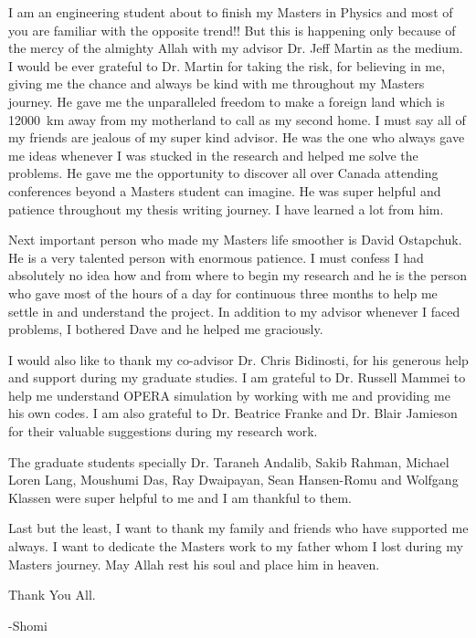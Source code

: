 \newpage
\tableofcontents
{}
\listoffigures
\listoftables

\begin{acknowledgments}
\vspace{2em}

I am an engineering student about to finish my Masters in Physics and most of you are familiar with the opposite trend!! But this is happening only because of the mercy of the almighty Allah with my advisor Dr. Jeff Martin as the medium. I would be ever grateful to Dr. Martin for taking the risk, for believing in me, giving me the chance and always be kind with me throughout my Masters journey. He gave me the unparalleled freedom to make a foreign land which is 12000~km away from my motherland to call as my second home. I must say all of my friends are jealous of my super kind advisor. He was the one who always gave me ideas whenever I was stucked in the research and helped me solve the problems. He gave me the opportunity to discover all over Canada attending conferences beyond a Masters student can imagine. He was super helpful and patience throughout my thesis writing journey. I have learned a lot from him.

Next important person who made my Masters life smoother is David Ostapchuk. He is a very talented person with enormous patience. I must confess I had absolutely no idea how and from where to begin my research and he is the person who gave most of the hours of a day for continuous three months to help me settle in and understand the project. In addition to my advisor whenever I faced problems, I bothered Dave and he helped me graciously.

I would also like to thank my co-advisor Dr. Chris Bidinosti, for his generous help and support during my graduate studies. I am grateful to Dr. Russell Mammei to help me understand OPERA simulation by working with me and providing me his own codes. I am also grateful to Dr. Beatrice Franke and Dr. Blair Jamieson for their valuable suggestions during my research work. 

The graduate students specially Dr. Taraneh Andalib, Sakib Rahman, Michael Loren Lang, Moushumi Das, Ray Dwaipayan, Sean Hansen-Romu and Wolfgang Klassen were super helpful to me and I am thankful to them. 

Last but the least, I want to thank my family and friends who have supported me always. I want to dedicate the Masters work to my father whom I lost during my Masters journey. May Allah rest his soul and place him in heaven.

\vspace{2em}
Thank You All.

-Shomi

\end{acknowledgments}

